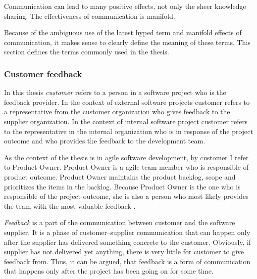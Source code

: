 \documentclass[english,12pt,a4paper,pdftex]{article}
\begin{document}
Communication can lead to many positive effects, not only the sheer knowledge sharing. The effectiveness of communication is manifold.

Because of the ambiguous use of the latest hyped term and manifold effects of communication, it makes sense to clearly define the meaning of these terms. This section defines the terms commonly used in the thesis.

\subsubsection{Customer feedback}

In this thesis \textit{customer} refers to a person in a software project who is the feedback provider. In the context of external software projects customer refers to a representative from the customer organization who gives feedback to the supplier organization. In the context of internal software project customer refers to the representative in the internal organization who is in response of the project outcome and who provides the feedback to the development team.

As the context of the thesis is in agile software development, by customer I refer to Product Owner. Product Owner is a agile team member who is responsible of product outcome. Product Owner maintains the product backlog, scope and prioritizes the items in the backlog. Because Product Owner is the one who is responsible of the project outcome, she is also a person who most likely provides the team with the most valuable feedback \citep{pichler2010}.

\textit{Feedback} is a part of the communication between customer and the software supplier. It is a phase of customer--supplier communication that can happen only after the supplier has delivered something concrete to the customer. Obviously, if supplier has not delivered yet anything, there is very little for customer to give feedback from. Thus, it can be argued, that feedback is a form of communication that happens only after the project has been going on for some time.
\end{document}
